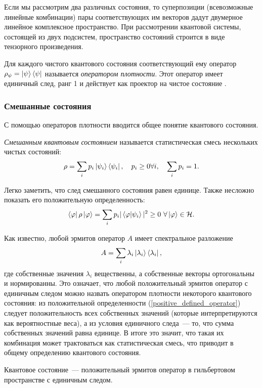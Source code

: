 Если мы рассмотрим два различных состояния, то суперпозиции (всевозможные линейные комбинации) пары соответствующих им векторов дадут двумерное линейное комплексное пространство.
При рассмотрении квантовой системы, состоящей из двух подсистем, пространство состояний строится в виде тензорного произведения. 

\begin{definition}
Для каждого чистого квантового состояния \state{\psi} соответствующий ему оператор
$\rho_\psi = \left| \psi \right\rangle \left\langle \psi \right|$ называется \textit{оператором плотности}.
Этот оператор имеет единичный след, ранг 1 и действует как проектор на чистое состояние \state{\psi}.  
\end{definition}


\subsubsection{Смешанные состояния}
С помощью операторов плотности вводится общее понятие квантового состояния.

\begin{definition}
  \textit{Смешанным квантовым состоянием} называется статистическая смесь нескольких чистых состояний:
\begin{equation}
  \rho = \sum_i p_i \left| \psi_i \right\rangle\left\langle \psi_i \right|, \quad p_i \ge 0 \forall i, \quad \sum_i p_i = 1.
\end{equation}
\end{definition}

Легко заметить, что след смешанного состояния равен единице. Также несложно показать его положительную определенность:
\begin{equation}\label{positive_defined_operator}
  \left\langle \varphi \right|\rho\left| \varphi \right\rangle = \sum_i p_i |\left\langle \varphi|\psi_i\right\rangle|^2 \ge 0 \ \forall \left| \varphi \right\rangle \in \mathcal{H}.
\end{equation}

Как известно, любой эрмитов оператор $A$ имеет спектральное разложение
\begin{equation}
  A = \sum_i \lambda_i \left| \lambda_i \right\rangle\left\langle \lambda_i \right|,
\end{equation}
где собственные значения $\lambda_i$ вещественны, а собственные векторы  ортогональны и нормированны. Это означает, что любой положительный эрмитов оператор с единичным следом можно назвать оператором плотности некоторого квантового состояния: из положительной определенности (\ref{positive_defined_operator}) следует положительность всех собственных значений (которые интерпретируются как вероятностные веса), а из условия единичного следа~--- то, что сумма собственных значений равна единице. В итоге это значит, что такая их комбинация может трактоваться как статистическая смесь, что приводит в общему определению квантового состояния.
\begin{definition}
  Квантовое состояние~--- положительный эрмитов оператор в гильбертовом пространстве с единичным следом.
\end{definition}

